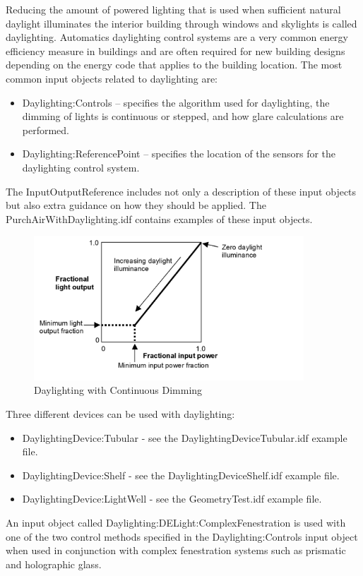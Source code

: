 Reducing the amount of powered lighting that is used when sufficient
natural daylight illuminates the interior building through windows
and skylights is called daylighting. Automatics daylighting control
systems are a very common energy efficiency measure in buildings and
are often required for new building designs depending on the energy
code that applies to the building location. The most common input
objects related to daylighting are:
\begin{itemize}
\item Daylighting:Controls -- specifies the algorithm used for daylighting,
the dimming of lights is continuous or stepped, and how glare calculations
are performed.
\item Daylighting:ReferencePoint -- specifies the location of the sensors
for the daylighting control system.
\end{itemize}
The InputOutputReference includes not only a description of these
input objects but also extra guidance on how they should be applied.
The PurchAirWithDaylighting.idf contains examples of these input objects.

\begin{figure}[hbtp]
\centering
\includegraphics[width=0.9\textwidth, height=0.9\textheight, keepaspectratio=true]{media/DaylightingContinuous.png}
\caption{Daylighting with Continuous Dimming}
\end{figure}


Three different devices can be used with daylighting:
\begin{itemize}
\item DaylightingDevice:Tubular - see the DaylightingDeviceTubular.idf example
file.
\item DaylightingDevice:Shelf - see the DaylightingDeviceShelf.idf example
file.
\item DaylightingDevice:LightWell - see the GeometryTest.idf example file.
\end{itemize}
An input object called Daylighting:DELight:ComplexFenestration is
used with one of the two control methods specified in the Daylighting:Controls
input object when used in conjunction with complex fenestration systems
such as prismatic and holographic glass.

